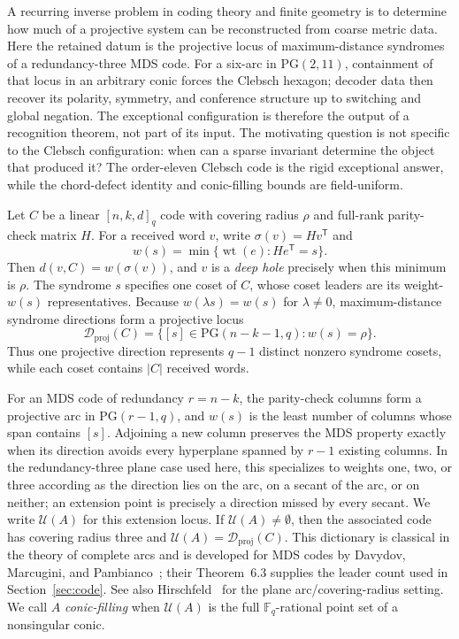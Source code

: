 \documentclass[11pt]{article}
\theoremstyle{definition}
\theoremstyle{remark}
\newcommand{\PG}{\mathrm{PG}}
\newcommand{\F}{\mathbb{F}}
\newcommand{\cU}{\mathcal{U}}
\begin{document}
A recurring inverse problem in coding theory and finite geometry is to
determine how much of a projective system can be reconstructed from coarse
metric data.  Here the retained datum is the projective locus of
maximum-distance syndromes of a redundancy-three MDS code.  For a six-arc in
$\PG(2,11)$, containment of that locus in an arbitrary conic forces the
Clebsch hexagon; decoder data then recover its polarity, symmetry, and
conference structure up to switching and global negation.  The exceptional
configuration is therefore the output of a
recognition theorem, not part of its input.  The motivating question is not
specific to the Clebsch configuration: when can a sparse invariant determine
the object that produced it?  The order-eleven Clebsch code is the rigid
exceptional answer, while the chord-defect identity and conic-filling bounds
are field-uniform.

Let $C$ be a linear $[n,k,d]_q$ code with covering radius $\rho$ and
full-rank parity-check matrix $H$. For a received word $v$, write
$\sigma(v)=Hv^{\mathsf T}$ and
\[
 w(s)=\min\{\operatorname{wt}(e):He^{\mathsf T}=s\}.
\]
Then $d(v,C)=w(\sigma(v))$, and $v$ is a \emph{deep hole} precisely when
this minimum is $\rho$. The syndrome $s$ specifies one coset of $C$, whose
coset leaders are its weight-$w(s)$ representatives. Because
$w(\lambda s)=w(s)$ for $\lambda\ne0$, maximum-distance syndrome directions
form a projective locus
\[
 \mathcal D_{\mathrm{proj}}(C)=
 \{[s]\in\PG(n-k-1,q):w(s)=\rho\}.
\]
Thus one projective direction represents $q-1$ distinct nonzero syndrome
cosets, while each coset contains $|C|$ received words.

For an MDS code of redundancy $r=n-k$, the parity-check columns form a
projective arc in $\PG(r-1,q)$, and $w(s)$ is the least number of columns
whose span contains $[s]$. Adjoining a new column preserves the MDS property
exactly when its direction avoids every hyperplane spanned by $r-1$ existing
columns. In the redundancy-three plane case used here, this specializes to
weights one, two, or three according as the direction lies on the arc, on a
secant of the arc, or on neither; an extension point is precisely a direction
missed by every secant. We write $\cU(A)$ for this extension locus. If
$\cU(A)\ne\emptyset$, then the associated code has covering radius three
and $\cU(A)=\mathcal D_{\mathrm{proj}}(C)$. This dictionary is classical in
the theory of complete arcs and is developed for MDS codes by Davydov,
Marcugini, and Pambianco~\cite{DMP2021}; their Theorem~6.3 supplies the
leader count used in Section~\ref{sec:code}. See also
Hirschfeld~\cite{Hirschfeld1998} for the plane arc/covering-radius setting.
We call $A$ \emph{conic-filling} when $\cU(A)$ is the full
$\F_q$-rational point set of a nonsingular conic.
\end{document}
